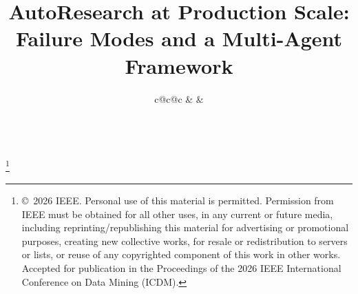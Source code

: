 \documentclass[conference]{IEEEtran}
\newcommand{\blfootnote}[1]{%
  \begingroup
  \renewcommand\thefootnote{}\footnote{#1}%
  \addtocounter{footnote}{-1}%
  \endgroup
}
\begin{document}
\title{AutoResearch at Production Scale: Failure Modes and a Multi-Agent Framework}

\author{%
\centering
\begin{tabular}{c@{\hspace{3em}}c@{\hspace{3em}}c}
 &
 &
 \\[1.4em]
 \\
\end{tabular}%
}

\maketitle

\blfootnote{\copyright~2026 IEEE. Personal use of this material is permitted. Permission from IEEE must be obtained for all other uses, in any current or future media, including reprinting/republishing this material for advertising or promotional purposes, creating new collective works, for resale or redistribution to servers or lists, or reuse of any copyrighted component of this work in other works. Accepted for publication in the Proceedings of the 2026 IEEE International Conference on Data Mining (ICDM).}
\end{document}
